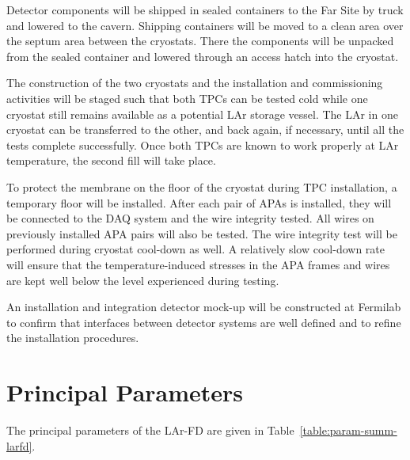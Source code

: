 Detector components will be shipped in sealed containers to the Far Site by truck and lowered to the cavern. Shipping containers will be moved to a clean area over the septum area between the cryostats. There the components will be unpacked from the sealed container and lowered  through an access hatch into the cryostat. 

The construction of the two cryostats and the installation and commissioning activities will
be staged such that both TPCs can be tested cold while one cryostat still remains available
as a potential LAr storage vessel. The LAr in one cryostat can be transferred to the other, and
back again, if necessary, until all the tests complete successfully. Once both TPCs are known to work properly at LAr temperature, the second fill will take place.

To protect the membrane on the floor of the cryostat during TPC installation, a temporary floor will be installed. 
After each pair of APAs is installed, they will be connected to the DAQ system and the wire integrity tested. All wires on previously installed APA pairs will also be tested. The wire integrity test will be performed during cryostat cool-down as well. A relatively slow cool-down rate will ensure that the temperature-induced stresses in the APA frames and wires are kept well below the level experienced during testing. 

An installation and integration detector mock-up will be constructed at Fermilab to confirm that interfaces between detector systems are well defined and to refine the installation procedures. 


\section{Principal Parameters}

The principal parameters of the LAr-FD are given in Table~\ref{table:param-summ-larfd}. 

